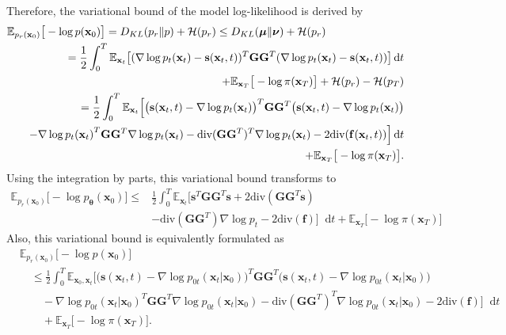 \documentclass{article}
\theoremstyle{definition}
\theoremstyle{remark}
\newcommand*\diff{\mathop{}\!\mathrm{d}}
\begin{document}
	Therefore, the variational bound of the model log-likelihood is derived by
	\begin{eqnarray*}
		\lefteqn{\mathbb{E}_{p_{r}(\mathbf{x}_{0})}\big[-\log{p(\mathbf{x}_{0})}\big]=D_{KL}(p_{r}\Vert p)+\mathcal{H}(p_{r})\le D_{KL}(\bm{\mu}\Vert\bm{\nu})+\mathcal{H}(p_{r})}&\\
		&&=\frac{1}{2}\int_{0}^{T}\mathbb{E}_{\mathbf{x}_{t}}\big[(\nabla\log{p_{t}(\mathbf{x}_{t})}-\mathbf{s}(\mathbf{x}_{t},t))^{T}\mathbf{G}\mathbf{G}^{T}(\nabla\log{p_{t}(\mathbf{x}_{t})}-\mathbf{s}(\mathbf{x}_{t},t))\big]\diff t\\
		&&\quad+\mathbb{E}_{\mathbf{x}_{T}}\big[-\log{\pi(\mathbf{x}_{T})}\big]+\mathcal{H}(p_{r})-\mathcal{H}(p_{T})\\
		&&=\frac{1}{2}\int_{0}^{T}\mathbb{E}_{\mathbf{x}_{t}}\Big[\big(\mathbf{s}(\mathbf{x}_{t},t)-\nabla\log{p_{t}(\mathbf{x}_{t})}\big)^{T}\mathbf{G}\mathbf{G}^{T}\big(\mathbf{s}(\mathbf{x}_{t},t)-\nabla\log{p_{t}(\mathbf{x}_{t})}\big)\\
		&&\quad-\nabla\log{p_{t}(\mathbf{x}_{t})}^{T}\mathbf{G}\mathbf{G}^{T}\nabla\log{p_{t}(\mathbf{x}_{t})}-\text{div}(\mathbf{G}\mathbf{G}^{T})^{T}\nabla\log{p_{t}(\mathbf{x}_{t})}-2\text{div}(\mathbf{f}(\mathbf{x}_{t},t))\Big]\diff t\\
		&&\quad+\mathbb{E}_{\mathbf{x}_{T}}\big[-\log{\pi(\mathbf{x}_{T})}\big].
	\end{eqnarray*}
	Using the integration by parts, this variational bound transforms to
	\begin{align*}
	\mathbb{E}_{p_{r}(\mathbf{x}_{0})}\big[-\log{p_{\bm{\theta}}(\mathbf{x}_{0})}\big]\le&\frac{1}{2}\int_{0}^{T}\mathbb{E}_{\mathbf{x}_{t}}\Big[\mathbf{s}^{T}\mathbf{G}\mathbf{G}^{T}\mathbf{s}+2\text{div}(\mathbf{G}\mathbf{G}^{T}\mathbf{s})\\
	&-\text{div}(\mathbf{G}\mathbf{G}^{T})\nabla\log{p_{t}}-2\text{div}(\mathbf{f})\Big]\diff t+\mathbb{E}_{\mathbf{x}_{T}}\big[-\log{\pi(\mathbf{x}_{T})}\big]
	\end{align*}
	Also, this variational bound is equivalently formulated as
	\begin{align*}
	&\mathbb{E}_{p_{r}(\mathbf{x}_{0})}\big[-\log{p(\mathbf{x}_{0})}\big]\\
	&\quad\le \frac{1}{2}\int_{0}^{T}\mathbb{E}_{\mathbf{x}_{0},\mathbf{x}_{t}}\Big[\big(\mathbf{s}(\mathbf{x}_{t},t)-\nabla\log{p_{0t}(\mathbf{x}_{t}\vert\mathbf{x}_{0})}\big)^{T}\mathbf{G}\mathbf{G}^{T}\big(\mathbf{s}(\mathbf{x}_{t},t)-\nabla\log{p_{0t}(\mathbf{x}_{t}\vert\mathbf{x}_{0})}\big)\\
	&\quad\quad-\nabla\log{p_{0t}(\mathbf{x}_{t}\vert\mathbf{x}_{0})}^{T}\mathbf{G}\mathbf{G}^{T}\nabla\log{p_{0t}(\mathbf{x}_{t}\vert\mathbf{x}_{0})}-\text{div}(\mathbf{G}\mathbf{G}^{T})^{T}\nabla\log{p_{0t}(\mathbf{x}_{t}\vert\mathbf{x}_{0})}-2\text{div}(\mathbf{f})\Big]\diff t\\
	&\quad\quad+\mathbb{E}_{\mathbf{x}_{T}}\big[-\log{\pi(\mathbf{x}_{T})}\big].
	\end{align*}
\end{document}
